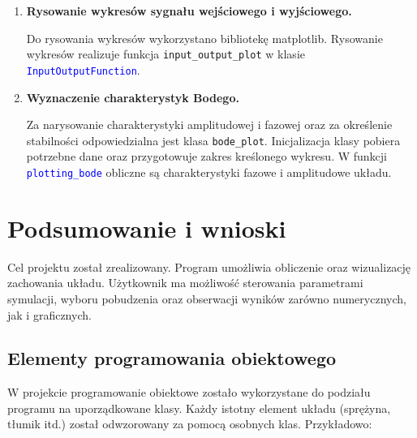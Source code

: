 \documentclass[10pt, a4paper]{article}
\begin{document}
\begin{enumerate}[label=\alph*.]
  \vspace{0.2cm}

  \item \textbf{Rysowanie wykresów sygnału wejściowego i wyjściowego.} \par\vspace{0.1cm}
  Do rysowania wykresów wykorzystano bibliotekę matplotlib. 
  Rysowanie wykresów realizuje funkcja {\texttt{input\_output\_plot}}
  w klasie \textcolor{blue}{\texttt{InputOutputFunction}}.

  \vspace{0.2cm}
  
  \item \textbf{Wyznaczenie charakterystyk Bodego.} \par\vspace{0.1cm}
    Za narysowanie charakterystyki amplitudowej i fazowej oraz za określenie stabilności
    odpowiedzialna jest klasa {\texttt{bode\_plot}}. Inicjalizacja klasy pobiera potrzebne dane
    oraz przygotowuje zakres kreślonego wykresu. W funkcji \textcolor{blue}{\texttt{plotting\_bode}} obliczne są charakterystyki fazowe i amplitudowe
    układu. 
  \vspace{0.2cm}

\end{enumerate}


\section{Podsumowanie i wnioski}

Cel projektu został zrealizowany. Program umożliwia obliczenie oraz wizualizację zachowania układu. Użytkownik ma możliwość sterowania parametrami symulacji, wyboru pobudzenia oraz obserwacji wyników zarówno numerycznych, jak i graficznych.

\vspace{0.5cm}

\subsection*{Elementy programowania obiektowego}

W projekcie programowanie obiektowe zostało wykorzystane do podziału programu na uporządkowane klasy. Każdy istotny element układu (sprężyna, tłumik itd.) został odwzorowany za pomocą osobnych klas. Przykładowo:
\end{document}
